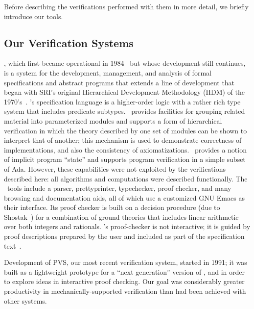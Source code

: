 Before describing the verifications performed with them in more
detail, we briefly introduce our tools.

\subsection{Our Verification Systems}

\ehdm, which first became operational in
1984~\cite{Melliar-Smith&Rushby} but whose development still
continues, is a system for the development, management, and analysis
of formal specifications and abstract programs that extends a line of
development that began with SRI's original Hierarchical Development
Methodology (HDM) of the 1970's~\cite{Spitzen:example}.  \ehdm's
specification language is a higher-order logic with a rather rich
type system that includes predicate subtypes.  \ehdm\ provides
facilities for grouping related material into parameterized modules
and supports a form of hierarchical verification in which the theory
described by one set of modules can be shown to interpret that of
another; this mechanism is used to demonstrate correctness of
implementations, and also the consistency of axiomatizations.
\ehdm\ provides a notion of implicit program ``state'' and supports program
verification in a simple subset of Ada.  However, these capabilities
were not exploited by the verifications described here: all
algorithms and computations were described functionally.  The \ehdm\
tools include a parser, prettyprinter, typechecker, proof checker, and
many browsing and documentation aids, all of which use a customized
GNU Emacs as their interface.  Its proof checker is built on a
decision procedure (due to Shostak~\cite{Shostak:combination}) for a
combination of ground theories that includes linear arithmetic over
both integers and rationals.  \ehdm's proof-checker is not
interactive; it is guided by proof descriptions prepared by the user
and included as part of the specification text~\cite{EHDM:tutorial}.

Development of PVS, our most recent verification system, started in
1991; it was built as a lightweight prototype for a ``next
generation'' version of \ehdm, and in order to explore ideas in
interactive proof checking.  Our goal was considerably greater
productivity in mechanically-supported verification than had been
achieved with other systems.  

